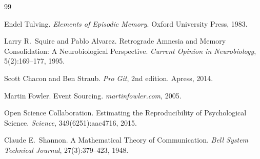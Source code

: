 \documentclass[11pt]{article}
\begin{document}
\begin{thebibliography}{99}

Endel Tulving.
\newblock \emph{Elements of Episodic Memory}.
\newblock Oxford University Press, 1983.

Larry R.\ Squire and Pablo Alvarez.
\newblock Retrograde Amnesia and Memory Consolidation: A Neurobiological Perspective.
\newblock \emph{Current Opinion in Neurobiology}, 5(2):169--177, 1995.

Scott Chacon and Ben Straub.
\newblock \emph{Pro Git}, 2nd edition.
\newblock Apress, 2014.

Martin Fowler.
\newblock Event Sourcing.
\newblock \emph{martinfowler.com}, 2005.

Open Science Collaboration.
\newblock Estimating the Reproducibility of Psychological Science.
\newblock \emph{Science}, 349(6251):aac4716, 2015.

Claude E.\ Shannon.
\newblock A Mathematical Theory of Communication.
\newblock \emph{Bell System Technical Journal}, 27(3):379--423, 1948.

\end{thebibliography}
\end{document}
